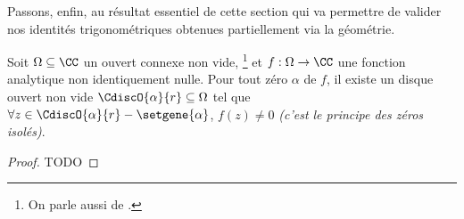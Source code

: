 Passons, enfin, au résultat essentiel de cette section qui va permettre de valider nos identités trigonométriques obtenues partiellement via la géométrie.


\begin{fact} \label{isolated-zero}
    Soit $\Omega \subseteq \CC$ un ouvert connexe non vide,%
    \footnote{
    	On parle aussi de .
    }
    et
    $f: \Omega \rightarrow \CC$ une fonction analytique non identiquement nulle.
	Pour tout zéro $\alpha$ de $f$, il existe un disque ouvert non vide $\CdiscO{\alpha}{r} \subseteq \Omega$ tel que 
	$\forall z \in \CdiscO{\alpha}{r} - \setgene{\alpha}$, $f(z) \neq 0$
	\emph{(c'est le principe des zéros isolés)}.  
\end{fact}


\begin{proof}
	TODO
\end{proof}


%
%
%
%
